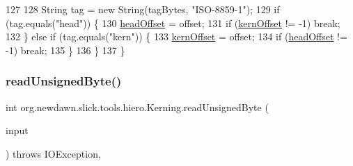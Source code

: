 \begin{DoxyCode}
127 
128             String tag = \textcolor{keyword}{new} String(tagBytes, \textcolor{stringliteral}{"ISO-8859-1"});
129             \textcolor{keywordflow}{if} (tag.equals(\textcolor{stringliteral}{"head"})) \{
130                 \mbox{\hyperlink{classorg_1_1newdawn_1_1slick_1_1tools_1_1hiero_1_1_kerning_a62f4639c6dfb62dbec439d7abf53f20c}{headOffset}} = offset;
131                 \textcolor{keywordflow}{if} (\mbox{\hyperlink{classorg_1_1newdawn_1_1slick_1_1tools_1_1hiero_1_1_kerning_a382489aa078253e87f23dc0be2ebd299}{kernOffset}} != -1) \textcolor{keywordflow}{break};
132             \} \textcolor{keywordflow}{else} \textcolor{keywordflow}{if} (tag.equals(\textcolor{stringliteral}{"kern"})) \{
133                 \mbox{\hyperlink{classorg_1_1newdawn_1_1slick_1_1tools_1_1hiero_1_1_kerning_a382489aa078253e87f23dc0be2ebd299}{kernOffset}} = offset;
134                 \textcolor{keywordflow}{if} (\mbox{\hyperlink{classorg_1_1newdawn_1_1slick_1_1tools_1_1hiero_1_1_kerning_a62f4639c6dfb62dbec439d7abf53f20c}{headOffset}} != -1) \textcolor{keywordflow}{break};
135             \}
136         \}
137     \}
\end{DoxyCode}
\mbox{\label{classorg_1_1newdawn_1_1slick_1_1tools_1_1hiero_1_1_kerning_a433922be5e8ae2ea7ebecc17adb480d1}} 
\subsubsection{\texorpdfstring{read\+Unsigned\+Byte()}{readUnsignedByte()}}
{\footnotesize\ttfamily int org.\+newdawn.\+slick.\+tools.\+hiero.\+Kerning.\+read\+Unsigned\+Byte (\begin{DoxyParamCaption}\item[{Input\+Stream}]{input }\end{DoxyParamCaption}) throws I\+O\+Exception\hspace{0.3cm}{\ttfamily [inline]}, {\ttfamily [private]}}


